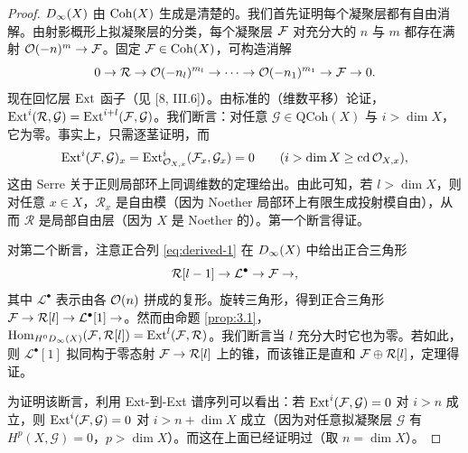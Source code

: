 \begin{proof}
$D_\infty(X)$ 由 $\operatorname{Coh}(X)$ 生成是清楚的。我们首先证明每个凝聚层都有自由消解。由射影概形上拟凝聚层的分类，每个凝聚层 $\mathcal{F}$ 对充分大的 $n$ 与 $m$ 都存在满射 $\mathcal{O}(-n)^m\to\mathcal{F}$。固定 $\mathcal{F}\in\operatorname{Coh}(X)$，可构造消解
\begin{equation}\label{eq:derived-1}
  0 \to \mathcal{R} \to \mathcal{O}(-n_l)^{m_l} \to \cdots \to \mathcal{O}(-n_1)^{m_1} \to \mathcal{F} \to 0 .
\end{equation}
现在回忆层 $\operatorname{Ext}$ 函子（见 [8, III.6]）。由标准的（维数平移）论证，$\operatorname{Ext}^i(\mathcal{R},\mathcal{G}) = \operatorname{Ext}^{i+l}(\mathcal{F},\mathcal{G})$。我们断言：对任意 $\mathcal{G}\in\mathrm{QCoh}(X)$ 与 $i>\dim X$，它为零。事实上，只需逐茎证明，而
\[
  \operatorname{Ext}^i(\mathcal{F},\mathcal{G})_x = \operatorname{Ext}^i_{\mathcal{O}_{X,x}}(\mathcal{F}_x,\mathcal{G}_x) = 0
  \qquad (i > \dim X \ge \operatorname{cd}\mathcal{O}_{X,x}),
\]
这由 Serre 关于正则局部环上同调维数的定理给出。由此可知，若 $l>\dim X$，则对任意 $x\in X$，$\mathcal{R}_x$ 是自由模（因为 Noether 局部环上有限生成投射模自由），从而 $\mathcal{R}$ 是局部自由层（因为 $X$ 是 Noether 的）。第一个断言得证。


对第二个断言，注意正合列 \eqref{eq:derived-1} 在 $D_\infty(X)$ 中给出正合三角形
\[
  \mathcal{R}[l-1] \to \mathcal{L}^\bullet \to \mathcal{F} \to ,
\]
其中 $\mathcal{L}^\bullet$ 表示由各 $\mathcal{O}(n)$ 拼成的复形。旋转三角形，得到正合三角形 $\mathcal{F} \to \mathcal{R}[l] \to \mathcal{L}^\bullet[1] \to$。然而由命题 \ref{prop:3.1}，$\operatorname{Hom}_{H^0D_\infty(X)}(\mathcal{F},\mathcal{R}[l]) = \operatorname{Ext}^l(\mathcal{F},\mathcal{R})$。我们断言当 $l$ 充分大时它也为零。若如此，则 $\mathcal{L}^\bullet[1]$ 拟同构于零态射 $\mathcal{F}\to\mathcal{R}[l]$ 上的锥，而该锥正是直和 $\mathcal{F}\oplus\mathcal{R}[l]$，定理得证。


为证明该断言，利用 Ext-到-Ext 谱序列可以看出：若 $\operatorname{Ext}^i(\mathcal{F},\mathcal{G})=0$ 对 $i>n$ 成立，则 $\operatorname{Ext}^i(\mathcal{F},\mathcal{G})=0$ 对 $i>n+\dim X$ 成立（因为对任意拟凝聚层 $\mathcal{G}$ 有 $H^p(X,\mathcal{G})=0$，$p>\dim X$）。而这在上面已经证明过（取 $n=\dim X$）。
\end{proof}

